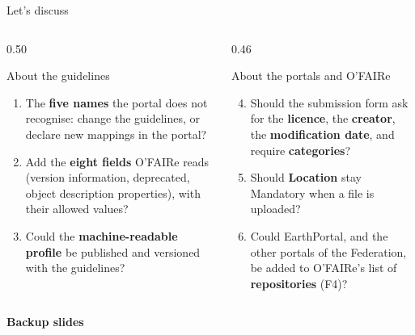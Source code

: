 \documentclass[aspectratio=169,10pt]{beamer}
\newif\ifshownumber\shownumbertrue
\begin{document}
\begin{frame}{Let's discuss}
  \begin{columns}[T]
    \begin{column}{0.50\textwidth}
      \begin{block}{About the guidelines}
        \small
        \begin{enumerate}
          \item The \textbf{five names} the portal does not recognise: change the guidelines, or
                declare new mappings in the portal?
          \item Add the \textbf{eight fields} O'FAIRe reads (version information, deprecated,
                object description properties), with their allowed values?
          \item Could the \textbf{machine-readable profile} be published and versioned with the
                guidelines?
        \end{enumerate}
      \end{block}
    \end{column}
    \begin{column}{0.46\textwidth}
      \begin{block}{About the portals and O'FAIRe}
        \small
        \begin{enumerate}
          \setcounter{enumi}{3}
          \item Should the submission form ask for the \textbf{licence}, the \textbf{creator}, the
                \textbf{modification date}, and require \textbf{categories}?
          \item Should \textbf{Location} stay Mandatory when a file is uploaded?
          \item Could EarthPortal, and the other portals of the Federation, be added to O'FAIRe's
                list of \textbf{repositories} (F4)?
        \end{enumerate}
      \end{block}
    \end{column}
  \end{columns}
\end{frame}

\appendix
{\shownumberfalse
\begin{frame}[noframenumbering]
  \centering
  {\color{epnavy}\fontsize{22}{26}\selectfont\bfseries Backup slides}
\end{frame}
}
\end{document}
